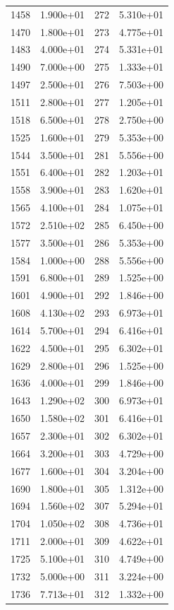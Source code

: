 \documentclass[12pt]{article}
\begin{document}
\begin{longtable}{@{}cccc@{}}
1458 & 1.900e+01 & 272 & 5.310e+01 \\
1470 & 1.800e+01 & 273 & 4.775e+01 \\
1483 & 4.000e+01 & 274 & 5.331e+01 \\
1490 & 7.000e+00 & 275 & 1.333e+01 \\
1497 & 2.500e+01 & 276 & 7.503e+00 \\
1511 & 2.800e+01 & 277 & 1.205e+01 \\
1518 & 6.500e+01 & 278 & 2.750e+00 \\
1525 & 1.600e+01 & 279 & 5.353e+00 \\
1544 & 3.500e+01 & 281 & 5.556e+00 \\
1551 & 6.400e+01 & 282 & 1.203e+01 \\
1558 & 3.900e+01 & 283 & 1.620e+01 \\
1565 & 4.100e+01 & 284 & 1.075e+01 \\
1572 & 2.510e+02 & 285 & 6.450e+00 \\
1577 & 3.500e+01 & 286 & 5.353e+00 \\
1584 & 1.000e+00 & 288 & 5.556e+00 \\
1591 & 6.800e+01 & 289 & 1.525e+00 \\
1601 & 4.900e+01 & 292 & 1.846e+00 \\
1608 & 4.130e+02 & 293 & 6.973e+01 \\
1614 & 5.700e+01 & 294 & 6.416e+01 \\
1622 & 4.500e+01 & 295 & 6.302e+01 \\
1629 & 2.800e+01 & 296 & 1.525e+00 \\
1636 & 4.000e+01 & 299 & 1.846e+00 \\
1643 & 1.290e+02 & 300 & 6.973e+01 \\
1650 & 1.580e+02 & 301 & 6.416e+01 \\
1657 & 2.300e+01 & 302 & 6.302e+01 \\
1664 & 3.200e+01 & 303 & 4.729e+00 \\
1677 & 1.600e+01 & 304 & 3.204e+00 \\
1690 & 1.800e+01 & 305 & 1.312e+00 \\
1694 & 1.560e+02 & 307 & 5.294e+01 \\
1704 & 1.050e+02 & 308 & 4.736e+01 \\
1711 & 2.000e+01 & 309 & 4.622e+01 \\
1725 & 5.100e+01 & 310 & 4.749e+00 \\
1732 & 5.000e+00 & 311 & 3.224e+00 \\
1736 & 7.713e+01 & 312 & 1.332e+00 \\

\end{longtable}
\end{document}
